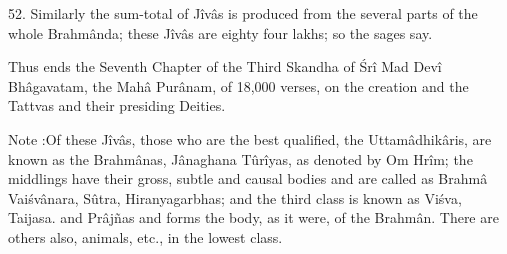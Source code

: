 52. Similarly the sum-total of J\^iv\^as is produced from the several parts of the whole Brahm\^anda; these J\^iv\^as are eighty four lakhs; so the sages say.

Thus ends the Seventh Chapter of the Third Skandha of \'Sr\^i Mad Dev\^i Bh\^agavatam, the Mah\^a Pur\^anam, of 18,000 verses, on the creation and the Tattvas and their presiding Deities.

Note :Of these J\^iv\^as, those who are the best qualified, the Uttam\^adhik\^aris, are known as the Brahm\^anas, J\^anaghana Tûr\^iyas, as denoted by Om Hr\^im; the middlings have their gross, subtle and causal bodies and are called as Brahm\^a Vai\'sv\^anara, Sûtra, Hiranyagarbhas; and the third class is known as Vi\'sva, Taijasa. and Pr\^aj\~nas and forms the body, as it were, of the Brahm\^an. There are others also, animals, etc., in the lowest class.